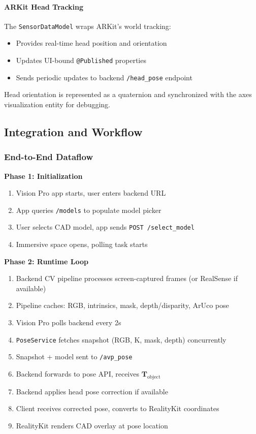 \paragraph{ARKit Head Tracking}

The \texttt{SensorDataModel} wraps ARKit's world tracking:

\begin{itemize}
    \item Provides real-time head position and orientation
    \item Updates UI-bound \texttt{@Published} properties
    \item Sends periodic updates to backend \texttt{/head\_pose} endpoint
\end{itemize}

Head orientation is represented as a quaternion and synchronized with the axes visualization entity for debugging.

\subsection{Integration and Workflow}

\subsubsection{End-to-End Dataflow}

\textbf{Phase 1: Initialization}
\begin{enumerate}
    \item Vision Pro app starts, user enters backend URL
    \item App queries \texttt{/models} to populate model picker
    \item User selects CAD model, app sends \texttt{POST /select\_model}
    \item Immersive space opens, polling task starts
\end{enumerate}

\textbf{Phase 2: Runtime Loop}
\begin{enumerate}
    \item Backend CV pipeline processes screen-captured frames (or RealSense if available)
    \item Pipeline caches: RGB, intrinsics, mask, depth/disparity, ArUco pose
    \item Vision Pro polls backend every 2s
    \item \texttt{PoseService} fetches snapshot (RGB, K, mask, depth) concurrently
    \item Snapshot + model sent to \texttt{/avp\_pose}
    \item Backend forwards to pose API, receives $\mathbf{T}_{\text{object}}$
    \item Backend applies head pose correction if available
    \item Client receives corrected pose, converts to RealityKit coordinates
    \item RealityKit renders CAD overlay at pose location
\end{enumerate}

